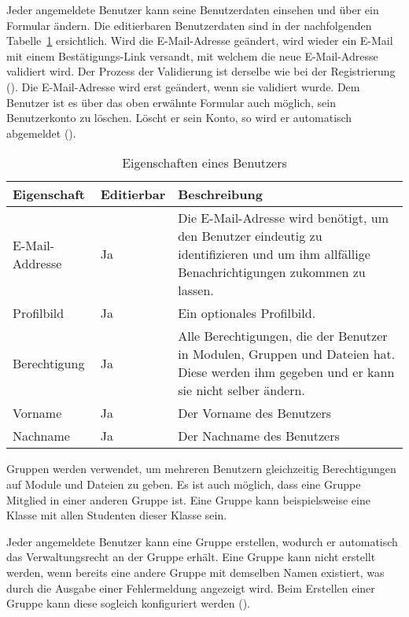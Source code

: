 Jeder angemeldete Benutzer kann seine Benutzerdaten einsehen und über ein Formular ändern. Die editierbaren Benutzerdaten sind in der nachfolgenden Tabelle~\ref{tab:benutzer_eigenschaften} ersichtlich. Wird die E-Mail-Adresse geändert, wird wieder ein E-Mail mit einem Bestätigungs-Link versandt, mit welchem die neue E-Mail-Adresse validiert wird. Der Prozess der Validierung ist derselbe wie bei der Registrierung (). Die E-Mail-Adresse wird erst geändert, wenn sie validiert wurde. 
Dem Benutzer ist es über das oben erwähnte Formular auch möglich, sein Benutzerkonto zu löschen. Löscht er sein Konto, so wird er automatisch abgemeldet ().

\begin{table}[H]
\begin{tabularx}{\textwidth}{|l|l|X|} \hline
\textbf{Eigenschaft} &\textbf{Editierbar} & \textbf{Beschreibung} \\ \hline
E-Mail-Addresse		& Ja 	& Die E-Mail-Adresse wird benötigt, um den Benutzer eindeutig zu identifizieren und um ihm allfällige Benachrichtigungen zukommen zu lassen.\\ \hline
Profilbild			& Ja 	& Ein optionales Profilbild.\\ \hline
Berechtigung 		& Ja 	& Alle Berechtigungen, die der Benutzer in Modulen, Gruppen und Dateien hat. Diese werden ihm gegeben und er kann sie nicht selber ändern.\\ \hline
Vorname 			& Ja 	& Der Vorname des Benutzers\\ \hline
Nachname			& Ja	& Der Nachname des Benutzers\\ \hline
\end{tabularx}
\caption{Eigenschaften eines Benutzers}
\label{tab:benutzer_eigenschaften}
\end{table}

Gruppen werden verwendet, um mehreren Benutzern gleichzeitig Berechtigungen auf Module und Dateien zu geben. Es ist auch möglich, dass eine Gruppe Mitglied in einer anderen Gruppe ist. Eine Gruppe kann beispielsweise eine Klasse mit allen Studenten dieser Klasse sein.

Jeder angemeldete Benutzer kann eine Gruppe erstellen, wodurch er automatisch das Verwaltungsrecht an der Gruppe erhält. Eine Gruppe kann nicht erstellt werden, wenn bereits eine andere Gruppe mit demselben Namen existiert, was durch die Ausgabe einer Fehlermeldung angezeigt wird.
Beim Erstellen einer Gruppe kann diese sogleich konfiguriert werden ().

